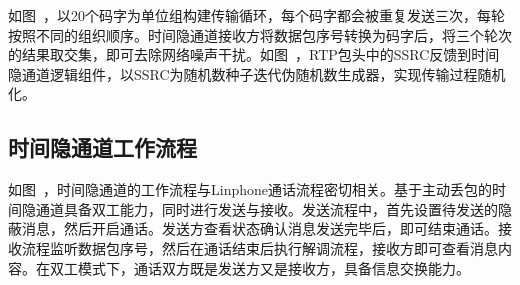 
如图\ ，以20个码字为单位组构建传输循环，每个码字都会被重复发送三次，每轮按照不同的组织顺序。时间隐通道接收方将数据包序号转换为码字后，将三个轮次的结果取交集，即可去除网络噪声干扰。如图\ ，RTP包头中的SSRC反馈到时间隐通道逻辑组件，以SSRC为随机数种子迭代伪随机数生成器，实现传输过程随机化。

\subsection{时间隐通道工作流程}
\label{chap:linphone:designation:workflow}


如图\ ，时间隐通道的工作流程与Linphone通话流程密切相关。基于主动丢包的时间隐通道具备双工能力，同时进行发送与接收。发送流程中，首先设置待发送的隐蔽消息，然后开启通话。发送方查看状态确认消息发送完毕后，即可结束通话。接收流程监听数据包序号，然后在通话结束后执行解调流程，接收方即可查看消息内容。在双工模式下，通话双方既是发送方又是接收方，具备信息交换能力。